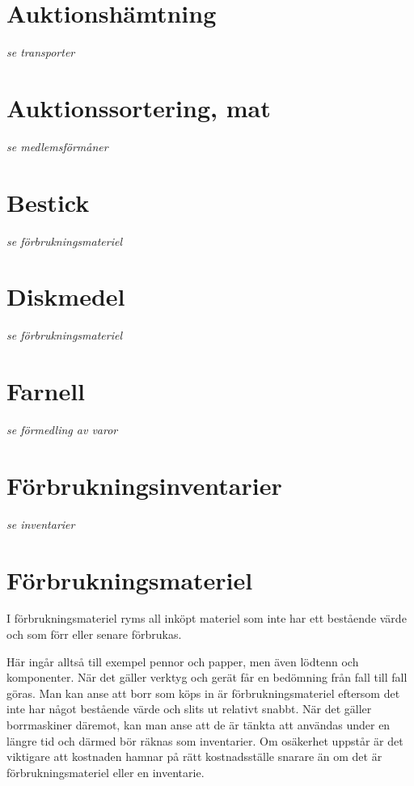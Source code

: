 
				\section{Auktionshämtning}
				\emph{se transporter}
			
				\section{Auktionssortering, mat}
				\emph{se medlemsförmåner}
			
				\section{Bestick}
				\emph{se förbrukningsmateriel}
			
				\section{Diskmedel}
				\emph{se förbrukningsmateriel}
			
				\section{Farnell}
				\emph{se förmedling av varor}
			
				\section{Förbrukningsinventarier}
				\emph{se inventarier}
			
				\section{Förbrukningsmateriel}
				
				I förbrukningsmateriel ryms all inköpt materiel som inte har ett bestående värde och som förr eller senare förbrukas.
		
		Här ingår alltså till exempel pennor och papper, men även lödtenn och komponenter. När det gäller verktyg och gerät får en bedömning från fall till fall göras. Man kan anse att borr som köps in är förbrukningsmateriel eftersom det inte har något bestående värde och slits ut relativt snabbt. När det gäller borrmaskiner däremot, kan man anse att de är tänkta att användas under en längre tid och därmed bör räknas som inventarier. Om osäkerhet uppstår är det viktigare att kostnaden hamnar på rätt kostnadsställe snarare än om det är förbrukningsmateriel eller en inventarie.
		
